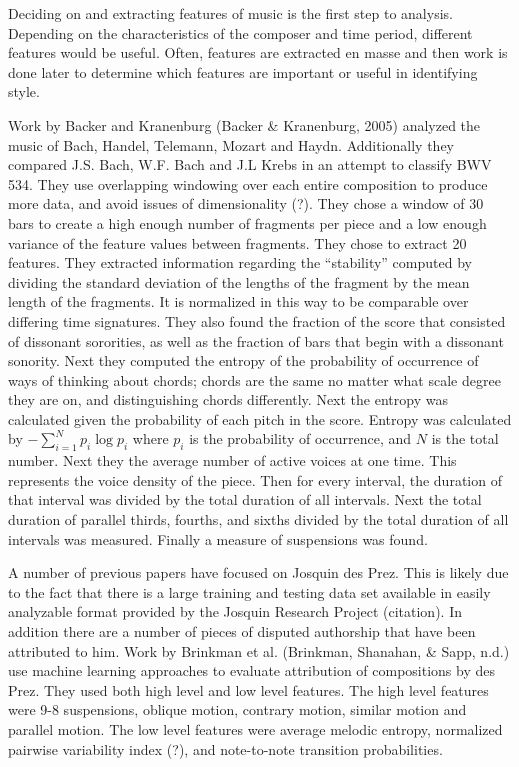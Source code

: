 \documentclass[12pt,twoside]{reedthesis}
\theoremstyle{definition}
\theoremstyle{definition}
\theoremstyle{definition}
\theoremstyle{remark}
\begin{document}
Deciding on and extracting features of music is the first step to
analysis. Depending on the characteristics of the composer and time
period, different features would be useful. Often, features are
extracted en masse and then work is done later to determine which
features are important or useful in identifying style.

Work by Backer and Kranenburg (Backer \& Kranenburg, 2005) analyzed the
music of Bach, Handel, Telemann, Mozart and Haydn. Additionally they
compared J.S. Bach, W.F. Bach and J.L Krebs in an attempt to classify
BWV 534. They use overlapping windowing over each entire composition to
produce more data, and avoid issues of dimensionality (?). They chose a
window of 30 bars to create a high enough number of fragments per piece
and a low enough variance of the feature values between fragments. They
chose to extract 20 features. They extracted information regarding the
``stability'' computed by dividing the standard deviation of the lengths
of the fragment by the mean length of the fragments. It is normalized in
this way to be comparable over differing time signatures. They also
found the fraction of the score that consisted of dissonant sororities,
as well as the fraction of bars that begin with a dissonant sonority.
Next they computed the entropy of the probability of occurrence of ways
of thinking about chords; chords are the same no matter what scale
degree they are on, and distinguishing chords differently. Next the
entropy was calculated given the probability of each pitch in the score.
Entropy was calculated by \(-\sum_{i = 1}^{N}p_i\log{p_i}\) where
\(p_i\) is the probability of occurrence, and \(N\) is the total number.
Next they the average number of active voices at one time. This
represents the voice density of the piece. Then for every interval, the
duration of that interval was divided by the total duration of all
intervals. Next the total duration of parallel thirds, fourths, and
sixths divided by the total duration of all intervals was measured.
Finally a measure of suspensions was found.

A number of previous papers have focused on Josquin des Prez. This is
likely due to the fact that there is a large training and testing data
set available in easily analyzable format provided by the Josquin
Research Project (citation). In addition there are a number of pieces of
disputed authorship that have been attributed to him. Work by Brinkman
et al. (Brinkman, Shanahan, \& Sapp, n.d.) use machine learning
approaches to evaluate attribution of compositions by des Prez. They
used both high level and low level features. The high level features
were 9-8 suspensions, oblique motion, contrary motion, similar motion
and parallel motion. The low level features were average melodic
entropy, normalized pairwise variability index (?), and note-to-note
transition probabilities.
\end{document}
